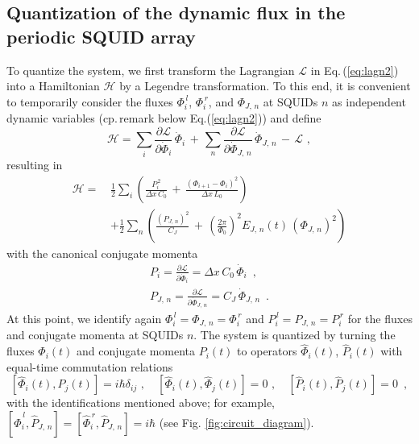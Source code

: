 \subsection{Quantization of the dynamic flux in the periodic SQUID array}

To quantize the system, we first transform the Lagrangian $\mathcal{L}$ in Eq.\,(\ref{eq:lagn2})
into a Hamiltonian $\mathcal{H}$ by a Legendre transformation.
To this end, it is convenient to temporarily consider the fluxes $\Phi_i^{\,l}$, $\Phi_i^{\,r}$, and $\Phi_{J,\,n}$ 
at SQUIDs $n$ as independent dynamic variables (cp.\,remark below Eq.(\ref{eq:lagn2})) and define 
%
\begin{equation} \label{eq:ham1}
\mathcal{H} = \sum_{i} \frac{\partial\mathcal{L}}{\partial\dot{\Phi}_i} \, \dot{\Phi}_i 
\, + \, \sum_{n} \frac{\partial\mathcal{L}}{\partial\dot{\Phi}_{J,\,n}} \, \dot{\Phi}_{J,\,n}
\, - \, \mathcal{L} \, \, , 
\end{equation}
%
resulting in
%
\begin{equation} \label{eq:ham2}
\begin{split}
\mathcal{H} = \, & \frac{1}{2} \sum_i \left( \frac{P_i^{\,2}}{\Delta x \, C_{0}} \, + \, 
\frac{\left(\Phi_{i+1} - \Phi_{i}\right)^{2}}{\Delta x \, L_{0}} \right)  \\[2mm]
& + \frac{1}{2} \sum_n \left( \frac{\left(P_{J,\,n}\right)^2}{C_{J}} \, + \, 
 \left(\frac{2 \pi}{\Phi_0} \right)^2 E_{J,\,n}(t) \, \left( \Phi_{J,\,n} \right)^2 
\right)
\end{split}
\end{equation}
%
with the canonical conjugate momenta
%
\begin{subequations} \label{eq:mom}
\begin{eqnarray} 
P_i = \frac{\partial\mathcal{L}}{\partial\dot{\Phi}_i} = \Delta x \, C_0 \, \dot{\Phi}_i \label{eq:moma} \, \, \, , \\[2mm]
P_{J,\,n} = \frac{\partial\mathcal{L}}{\partial\dot{\Phi}_{J,\,n}} =  C_J \, \dot{\Phi}_{J,\,n} \, \, \,  . \label{eq:momb}
\end{eqnarray}
\end{subequations}
%
At this point, we identify again 
$\Phi_i^{\,l} = \Phi_{J,\,n} = \Phi_i^{\,r}$ and $P_i^{\,l} = P_{J,\,n} = P_i^{\,r}$
for the fluxes and conjugate momenta at SQUIDs $n$.
The system is quantized by turning the fluxes $\Phi_i(t)$ and conjugate momenta $P_i(t)$ 
to operators $\hat{\Phi}_i(t)$, $\hat{P}_i(t)$ with equal-time commutation relations
%
\begin{equation} \label{eq:cr} 
\left[\hat{\Phi}_i(t), \hat{P}_j(t) \right] = i \hbar \delta_{ij} \, \, , \quad 
\left[\hat{\Phi}_i(t), \hat{\Phi}_j(t) \right] = 0 \, \, , \quad 
\left[\hat{P}_i(t), \hat{P}_j(t) \right] = 0 \, \, \, , 
\end{equation}
%
with the identifications mentioned above; for example, 
$\left[\hat{\Phi}_i^{\,l}, \hat{P}_{J,\,n} \right] = 
\left[\hat{\Phi}_i^{\,r}, \hat{P}_{J,\,n} \right] = i \hbar$ (see Fig. \ref{fig:circuit_diagram}).


